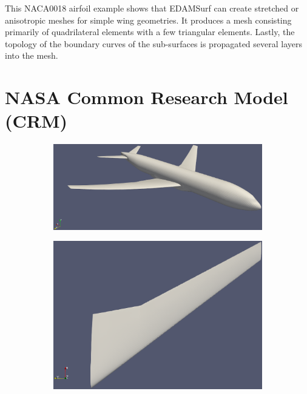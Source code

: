 This NACA0018 airfoil example shows that EDAMSurf can create stretched or anisotropic meshes for simple wing geometries. It produces a mesh consisting primarily of quadrilateral elements with a few triangular elements. Lastly, the topology of the boundary curves of the sub-surfaces is propagated several layers into the mesh.

\section{NASA Common Research Model (CRM)}

\begin{figure}[!hbt]
	\centering
	\begin{subfigure}{\textwidth}
		\centering
		\includegraphics[trim={0 3.5cm 0 1cm},clip,width=0.88\linewidth]{img/r/dpw4/dpw4.eps}
		\caption{}
		\label{dpw4}
	\end{subfigure}
	\begin{subfigure}{0.45\textwidth}
		\centering
		\includegraphics[width = 0.96\linewidth]{img/r/dpw4/wingTop.eps}
		\caption{}
		\label{wingTop}
	\end{subfigure}%
	\begin{subfigure}{0.45\textwidth}

\end{subfigure}
\end{figure}
